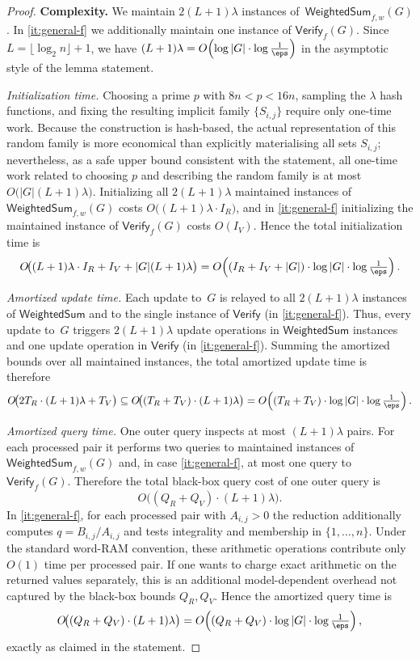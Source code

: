 \begin{proof}
\smallskip
\noindent\textbf{Complexity.}
We maintain $2(L+1)\lambda$ instances of~$\mathsf{WeightedSum}_{f,w}(G)$.
In \cref{it:general-f} we additionally maintain one instance of
$\mathsf{Verify}_f(G)$.
Since $L=\lfloor\log_2 n\rfloor+1$, we have $(L+1)\lambda =
O\!\left(\log|G|\cdot \log\frac{1}{\eps}\right)$ in the asymptotic style of the
lemma statement.

\emph{Initialization time.}
Choosing a prime $p$ with $8n<p<16n$, sampling the $\lambda$ hash functions,
and fixing the resulting implicit family $\{S_{i,j}\}$ require only one-time
work.
Because the construction is hash-based, the actual representation of this
random family is more economical than explicitly materialising all sets
$S_{i,j}$; nevertheless, as a safe upper bound consistent with the statement,
all one-time work related to choosing $p$ and describing the random family is
at most $O\!\bigl(|G|(L+1)\lambda\bigr)$.
Initializing all $2(L+1)\lambda$ maintained instances of
$\mathsf{WeightedSum}_{f,w}(G)$ costs
$O\!\bigl((L+1)\lambda\cdot I_R\bigr)$, and in
\cref{it:general-f} initializing the maintained instance of
$\mathsf{Verify}_f(G)$ costs $O(I_V)$.
Hence the total initialization time is
\[
O\!\bigl((L+1)\lambda\cdot I_R + I_V + |G|(L+1)\lambda\bigr)
=
O\!\left((I_R+I_V+|G|)\cdot \log|G|\cdot
\log\tfrac{1}{\eps}\right).
\]

\emph{Amortized update time.}
Each update to~$G$ is relayed to all $2(L+1)\lambda$ instances of
$\mathsf{WeightedSum}$ and to the single instance of $\mathsf{Verify}$
(in \cref{it:general-f}).
Thus, every update to~$G$ triggers $2(L+1)\lambda$ update operations in
$\mathsf{WeightedSum}$ instances and one update operation in
$\mathsf{Verify}$ (in \cref{it:general-f}).
Summing the amortized bounds over all maintained instances, the total
amortized update time is therefore
\[
O\!\bigl(2T_R\cdot (L+1)\lambda + T_V\bigr)
\subseteq
O\!\bigl((T_R+T_V)\cdot (L+1)\lambda\bigr)
=
O\!\left((T_R+T_V)\cdot \log|G|\cdot
\log\tfrac{1}{\eps}\right).
\]

\emph{Amortized query time.}
One outer query inspects at most $(L+1)\lambda$ pairs.
For each processed pair it performs two queries to maintained instances of
$\mathsf{WeightedSum}_{f,w}(G)$ and, in case \cref{it:general-f}, at most one
query to $\mathsf{Verify}_f(G)$.
Therefore the total black-box query cost of one outer query is
\[
O\!\bigl((Q_R+Q_V)\cdot (L+1)\lambda\bigr).
\]
In \cref{it:general-f}, for each processed pair with $A_{i,j}>0$ the reduction
additionally computes $q=B_{i,j}/A_{i,j}$ and tests integrality and membership
in $\{1,\dots,n\}$.
Under the standard word-RAM convention, these arithmetic operations contribute
only $O(1)$ time per processed pair.
If one wants to charge exact arithmetic on the returned values separately, this
is an additional model-dependent overhead not captured by the black-box bounds
$Q_R,Q_V$.
Hence the amortized query time is
\[
O\!\bigl((Q_R+Q_V)\cdot (L+1)\lambda\bigr)
=
O\!\left((Q_R+Q_V)\cdot \log|G|\cdot
\log\tfrac{1}{\eps}\right),
\]
exactly as claimed in the statement.


\end{proof}
